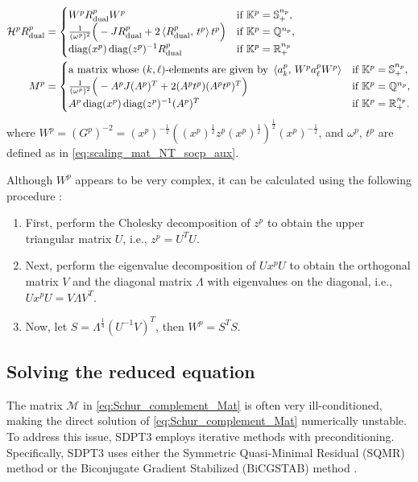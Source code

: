 \begin{align}
    \mathcal{H}^p R^p_{\text{dual}} &= \begin{cases}
        W^p R^p_{\text{dual}} W^p & \text{if } \mathbb{K}^p = \mathbb{S}^{n_p}_+, \\
        \frac{1}{(\omega^p)^2} \Big(-J R^p_{\text{dual}} + 2\left\langle R^p_{\text{dual}}, \, t^p \right\rangle t^p\Big) & \text{if } \mathbb{K}^p = \mathbb{Q}^{n_p},\\
        \operatorname{diag}(x^p) \operatorname{diag}(z^p)^{-1} R^p_{\text{dual}} & \text{if } \mathbb{K}^p = \mathbb{R}^{n_p}_+
    \end{cases}\\
    M^p &= \begin{cases}
        \text{a matrix whose $(k,\ell)$-elements are given by } \left\langle a^p_k, \, W^p a^p_\ell W^p \right\rangle & \text{if } \mathbb{K}^p = \mathbb{S}^{n_p}_+,\\
        \frac{1}{(\omega^p)^2}\Big(-A^p J (A^p)^T + 2 (A^p t^p)(A^p t^p)^T \Big) & \text{if } \mathbb{K}^p = \mathbb{Q}^{n_p}, \\
        A^p \operatorname{diag}(x^p) \operatorname{diag}(z^p)^{-1} (A^p)^T & \text{if } \mathbb{K}^p = \mathbb{R}^{n_p}_+.
    \end{cases} \label{eq:NT_M}
\end{align}
where $W^p = (G^p)^{-2} = (x^p)^{-\frac{1}{2}}((x^p)^{\frac{1}{2}} z^p (x^p)^{\frac{1}{2}})^{\frac{1}{2}} (x^p)^{-\frac{1}{2}}$, and $\omega^p$, $t^p$ are defined as in \eqref{eq:scaling_mat_NT_socp_aux}.

Although $W^p$ appears to be very complex, it can be calculated using the following procedure \cite{todd1998}:
\begin{enumerate}
    \item First, perform the Cholesky decomposition of $z^p$ to obtain the upper triangular matrix $U$, i.e., $z^p=U^TU$.
    \item Next, perform the eigenvalue decomposition of $U x^p U$ to obtain the orthogonal matrix $V$ and the diagonal matrix $\Lambda$ with eigenvalues on the diagonal, i.e., $U x^p U = V \Lambda V^T$.
    \item Now, let $S=\Lambda^\frac{1}{4}(U^{-1}V)^T$, then $W^p=S^T S$.
\end{enumerate}


\subsection{Solving the reduced equation} \label{sec:solve_reduced_eq}
The matrix $\mathcal{M}$ in \eqref{eq:Schur_complement_Mat} is often very ill-conditioned, making the direct solution of \eqref{eq:Schur_complement_Mat} numerically unstable. 
To address this issue, SDPT3 employs iterative methods with preconditioning. 
Specifically, SDPT3 \cite{toh1999} uses either the Symmetric Quasi-Minimal Residual (SQMR) method \cite{Freund1994} or the Biconjugate Gradient Stabilized (BiCGSTAB) method \cite{vanderVorst1992,Golub2013}.

